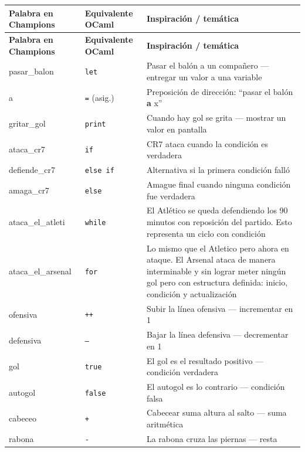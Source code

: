 \documentclass[12pt,a4paper]{article}
\begin{document}
\begin{center}
\renewcommand{\arraystretch}{1.3}
\begin{longtable}{>{\ttfamily}p{4cm} p{3cm} p{6.5cm}}
\toprule
\normalfont\textbf{Palabra en Champions} & \textbf{Equivalente OCaml} & \textbf{Inspiración / temática} \\
\midrule
\endfirsthead
\toprule
\normalfont\textbf{Palabra en Champions} & \textbf{Equivalente OCaml} & \textbf{Inspiración / temática} \\
\midrule
\endhead
\bottomrule
\endfoot

pasar\_balon      & \texttt{let}        & Pasar el balón a un compañero — entregar un valor a una variable \\
a                 & \texttt{=} (asig.)  & Preposición de dirección: ``pasar el balón \textbf{a} x'' \\
gritar\_gol       & \texttt{print}      & Cuando hay gol se grita — mostrar un valor en pantalla \\
ataca\_cr7        & \texttt{if}         & CR7 ataca cuando la condición es verdadera \\
defiende\_cr7     & \texttt{else if}    & Alternativa si la primera condición falló \\
amaga\_cr7        & \texttt{else}       & Amague final cuando ninguna condición fue verdadera \\
ataca\_el\_atleti & \texttt{while}      & El Atlético se queda defendiendo los 90 minutos con reposición del partido. Esto representa un ciclo con condición \\
ataca\_el\_arsenal & \texttt{for}       & Lo mismo que el Atletico pero ahora en ataque. El Arsenal ataca de manera interminable y sin lograr meter ningún gol pero con estructura definida: inicio, condición y actualización \\
ofensiva          & \texttt{++}         & Subir la línea ofensiva — incrementar en 1 \\
defensiva         & \texttt{--}         & Bajar la línea defensiva — decrementar en 1 \\
gol               & \texttt{true}       & El gol es el resultado positivo — condición verdadera \\
autogol           & \texttt{false}      & El autogol es lo contrario — condición falsa \\
cabeceo           & \texttt{+}          & Cabecear suma altura al salto — suma aritmética \\
rabona            & \texttt{-}          & La rabona cruza las piernas — resta \\

\end{longtable}
\end{center}
\end{document}
